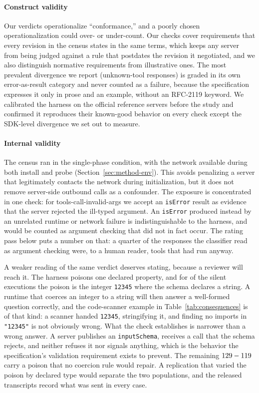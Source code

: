 \label{sec:threats}

\paragraph{Construct validity}
Our verdicts operationalize ``conformance,'' and a poorly chosen operationalization
could over- or under-count. Our checks cover requirements that every revision in the
census states in the same terms, which keeps any server from being judged against a
rule that postdates the revision it negotiated, and we also distinguish normative
requirements from illustrative ones. The most prevalent divergence we report
(unknown-tool responses) is graded in its own \textsf{error-as-result} category and
never counted as a failure, because the specification expresses it only in prose and
an example, without an RFC-2119 keyword. We calibrated the harness on the
official reference servers before the study and confirmed it reproduces their
known-good behavior on every check except the SDK-level divergence we set out to
measure.

\paragraph{Internal validity}
The census ran in the single-phase condition, with the network available
during both install and probe (Section~\ref{sec:method-env}). This avoids penalizing
a server that legitimately contacts the network during initialization, but it does
not remove server-side outbound calls as a confounder. The exposure is concentrated
in one check: for \textsf{tools-call-invalid-args} we accept an \texttt{isError}
result as evidence that the server rejected the ill-typed argument. An
\texttt{isError} produced instead by an unrelated runtime or network failure is
indistinguishable to the harness, and would be counted as argument checking that did
not in fact occur. The rating pass below puts a number on that: a quarter of the
responses the classifier read as argument checking were, to a human reader, tools
that had run anyway.

A weaker reading of the same verdict deserves stating, because a reviewer will
reach it. The harness poisons one declared property, and for
\NSilentIntPoison{} of the \NSilentExec{} silent executions the poison is the integer
\texttt{12345} where the schema declares a string. A runtime that coerces an integer
to a string will then answer a well-formed question correctly, and the code-scanner
example in Table~\ref{tab:consequences} is of that kind: a scanner handed
\texttt{12345}, stringifying it, and finding no imports in \texttt{"12345"} is not
obviously wrong. What the check establishes is narrower than a wrong answer. A server
publishes an \texttt{inputSchema}, receives a call that the schema rejects, and
neither refuses it nor signals anything, which is the behavior the specification's
validation requirement exists to prevent. The remaining \(129{} -
119{}\) carry a poison that no coercion rule would repair. A
replication that varied the poison by declared type would separate the two
populations, and the released transcripts record what was sent in every case.


